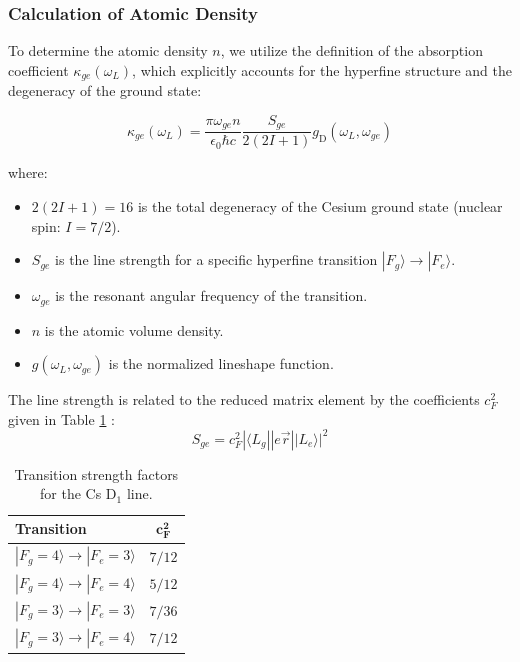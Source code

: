 \subsubsection{Calculation of Atomic Density}

To determine the atomic density $n$, we utilize the definition of the absorption coefficient $\kappa_{ge}(\omega_L)$, which explicitly accounts for the hyperfine structure and the degeneracy of the ground state:

\begin{equation}
    \kappa_{ge}(\omega_L) = \frac{\pi \omega_{ge} n}{\epsilon_0 \hbar c} \frac{S_{ge}}{2(2I + 1)} g_{\text{D}}(\omega_L, \omega_{ge})
\end{equation}

where:
\begin{itemize}
    \item $2(2I+1) = 16$ is the total degeneracy of the Cesium ground state (nuclear spin: $I=7/2$).
    \item $S_{ge}$ is the line strength for a specific hyperfine transition $|F_g\rangle \rightarrow |F_e\rangle$.
    \item $\omega_{ge}$ is the resonant angular frequency of the transition.
    \item $n$ is the atomic volume density.
    \item $g(\omega_L, \omega_{ge})$ is the normalized lineshape function.
\end{itemize}

The line strength is related to the reduced matrix element by the coefficients $c_F^2$ given in Table \ref{tab:transition_strengths} \cite{Steck_Quantum_Optics}:
\begin{equation}
    S_{ge} = c_F^2 |\langle L_g || e\vec{r} || L_e \rangle|^2
\end{equation}

\begin{table}[h]
    \centering
    \renewcommand{\arraystretch}{1.5} %
    \setlength{\tabcolsep}{18pt}      %
    
    \begin{tabular}{lc}
        \hline
        \textbf{Transition} & $\mathbf{c_F^2}$ \\
        \hline
        $|F_g = 4\rangle \rightarrow |F_e = 3\rangle$ & $7/12$ \\
        $|F_g = 4\rangle \rightarrow |F_e = 4\rangle$ & $5/12$ \\
        $|F_g = 3\rangle \rightarrow |F_e = 3\rangle$ & $7/36$ \\
        $|F_g = 3\rangle \rightarrow |F_e = 4\rangle$ & $7/12$ \\
        \hline
    \end{tabular}
    \caption{Transition strength factors  for the Cs D$_1$ line.}
    \label{tab:transition_strengths}
\end{table}

